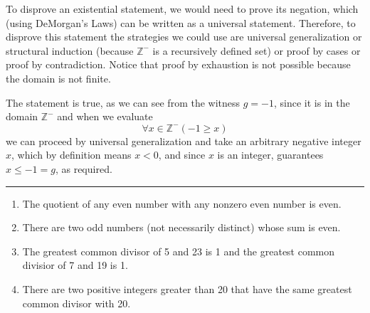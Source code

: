\documentclass[12pt, oneside]{article}
\begin{document}
\begin{enumerate}[labelindent=0pt, leftmargin=0pt]
    To disprove an existential statement, we would need to prove its negation, which (using DeMorgan's Laws) can be 
    written as a universal statement. Therefore, to disprove this statement the strategies we could use are 
    universal generalization or structural induction (because $\mathbb{Z}^{-}$ is a recursively defined set) or 
    proof by cases or proof by contradiction. Notice that proof by exhaustion is not possible because the domain is not finite.

    The statement is true, as we can see from the witness $g = -1$, since it is in the domain $\mathbb{Z}^{-}$ and when we evaluate
    \[
        \forall x \in \mathbb{Z}^{-} ( -1 \geq x)
    \]
    we can proceed by universal generalization and take an arbitrary negative integer $x$, which by definition means $x < 0$, 
    and since $x$ is an integer, guarantees $x \leq -1 = g$, as required.
    \rule{0.5\textwidth}{.4pt}

        \begin{enumerate}
            \item The quotient of any even number with any nonzero even number is even.
            \item There are two odd numbers (not necessarily distinct) whose sum is even.
            \item The greatest common divisor of 5 and 23 is 1 and the greatest common divisior of 7 and 19 is 1.
            \item There are two positive integers greater than 20 that have the same greatest common divisor with 20.
        \end{enumerate}
\end{enumerate}
\end{document}
